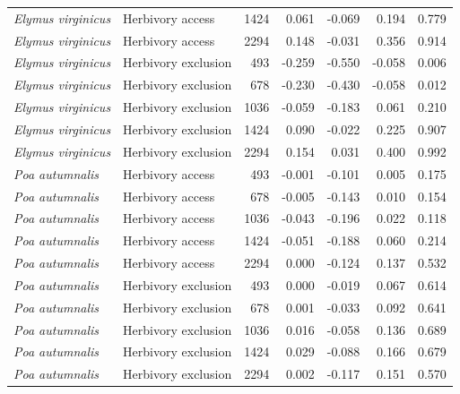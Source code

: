 \documentclass[12pt]{article}\usepackage[]{graphicx}\usepackage[dvipsnames]{xcolor}
\begin{document}
{\begin{landscape}
\begin{table}[ht]
\begin{tabular}{llrrrrr}
\textit{Elymus virginicus} & Herbivory access    & 1424 & 0.061  & -0.069 & 0.194 & 0.779 \\
\textit{Elymus virginicus} & Herbivory access    & 2294 & 0.148  & -0.031 & 0.356 & 0.914 \\
\textit{Elymus virginicus} & Herbivory exclusion & 493  & -0.259 & -0.550 & -0.058 & 0.006 \\
\textit{Elymus virginicus} & Herbivory exclusion & 678  & -0.230 & -0.430 & -0.058 & 0.012 \\
\textit{Elymus virginicus} & Herbivory exclusion & 1036 & -0.059 & -0.183 & 0.061  & 0.210 \\
\textit{Elymus virginicus} & Herbivory exclusion & 1424 & 0.090  & -0.022 & 0.225  & 0.907 \\
\textit{Elymus virginicus} & Herbivory exclusion & 2294 & 0.154  & 0.031  & 0.400  & 0.992 \\
\textit{Poa autumnalis}    & Herbivory access    & 493  & -0.001 & -0.101 & 0.005  & 0.175 \\
\textit{Poa autumnalis}    & Herbivory access    & 678  & -0.005 & -0.143 & 0.010  & 0.154 \\
\textit{Poa autumnalis}    & Herbivory access    & 1036 & -0.043 & -0.196 & 0.022  & 0.118 \\
\textit{Poa autumnalis}    & Herbivory access    & 1424 & -0.051 & -0.188 & 0.060  & 0.214 \\
\textit{Poa autumnalis}    & Herbivory access    & 2294 & 0.000  & -0.124 & 0.137  & 0.532 \\
\textit{Poa autumnalis}    & Herbivory exclusion & 493  & 0.000  & -0.019 & 0.067  & 0.614 \\
\textit{Poa autumnalis}    & Herbivory exclusion & 678  & 0.001  & -0.033 & 0.092  & 0.641 \\
\textit{Poa autumnalis}    & Herbivory exclusion & 1036 & 0.016  & -0.058 & 0.136  & 0.689 \\
\textit{Poa autumnalis}    & Herbivory exclusion & 1424 & 0.029  & -0.088 & 0.166  & 0.679 \\
\textit{Poa autumnalis}    & Herbivory exclusion & 2294 & 0.002  & -0.117 & 0.151  & 0.570 \\
\hline
\end{tabular}
\end{table}
\end{landscape}
\clearpage

}
\end{document}
